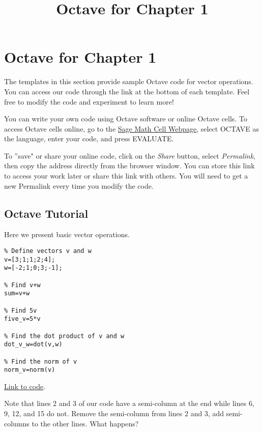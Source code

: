 \documentclass{ximera}
\title{Octave for Chapter 1} \license{CC BY-NC-SA 4.0}
\begin{document}
\begin{abstract}
\end{abstract}
\maketitle
\section*{Octave for Chapter 1}

The templates in this section provide sample Octave code for vector operations. You can access our code through the link at the bottom of each template.  Feel free to modify the code and experiment to learn more!  

You can write your own code using Octave software or online Octave cells.  To access Octave cells online, go to the \href{https://sagecell.sagemath.org/}{Sage Math Cell Webpage}, select OCTAVE as the language, enter your code, and press EVALUATE.  

To ''save" or share your online code, click on the \emph{Share} button, select \emph{Permalink}, then copy the address directly from the browser window.  You can store this link to access your work later or share this link with others.  You will need to get a new Permalink every time you modify the code.

\subsection*{Octave Tutorial}

\begin{template}\label{temp:vectorOps}
Here we present basic vector operations.
\begin{verbatim}
% Define vectors v and w
v=[3;1;1;2;4];
w=[-2;1;0;3;-1];

% Find v+w  
sum=v+w

% Find 5v
five_v=5*v

% Find the dot product of v and w
dot_v_w=dot(v,w)

% Find the norm of v
norm_v=norm(v)
\end{verbatim}

\href{https://sagecell.sagemath.org/?z=eJxdTUsKwyAQ3QveYTaBpG2gSZqVuCu9RChSolIX0WDMeP2O3TSUWbw37zNTwd1Y5w2gmVOIGyC8vIbMGcppEB1NL25PwVmWU9vTehWDaLuicFbBw1EazxmAs21fJNGDMSJn1qFRKMcTHoz0NqBDgjUGvc8Jgv09Jl2hypKwxktu_mo-xOWb56xQOl2gxuYDFmw51w==&lang=octave&interacts=eJyLjgUAARUAuQ==}{Link to code}.

\begin{remark}
    Note that lines 2 and 3 of our code have a semi-column at the end while lines 6, 9, 12, and 15 do not.  Remove the semi-column from lines 2 and 3, add semi-columns to the other lines.  What happens?
\end{remark}
\end{template}
\end{document}
